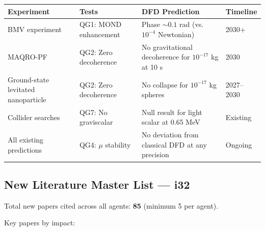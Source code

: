 \documentclass[11pt,a4paper]{article}
\begin{document}
\begin{center}
\begin{longtable}{p{4cm}p{3cm}p{4cm}l}
\toprule
\textbf{Experiment} & \textbf{Tests} & \textbf{DFD Prediction} & \textbf{Timeline} \\
\midrule
\endfirsthead
BMV experiment & QG1: MOND enhancement & Phase $\sim 0.1$ rad (vs.\ $10^{-4}$ Newtonian) & 2030+ \\
MAQRO-PF & QG2: Zero decoherence & No gravitational decoherence for $10^{-17}$ kg at 10 s & 2030 \\
Ground-state levitated nanoparticle & QG2: Zero decoherence & No collapse for $10^{-17}$ kg spheres & 2027--2030 \\
Collider searches & QG7: No graviscalar & Null result for light scalar at 0.65 MeV & Existing \\
All existing predictions & QG4: $\mu$ stability & No deviation from classical DFD at any precision & Ongoing \\
\bottomrule
\end{longtable}
\end{center}

\subsection{New Literature Master List --- i32}
\label{sec:literature}

Total new papers cited across all agents: \textbf{85} (minimum 5 per agent).

Key papers by impact:
\end{document}

